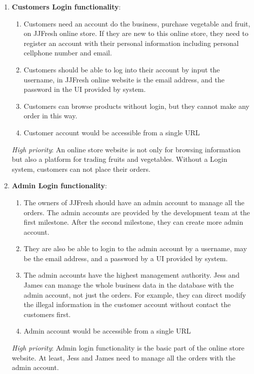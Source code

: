 \documentclass{report}
\begin{document}
\begin{enumerate}
  \item \textbf{Customers Login functionality}:
  \begin{enumerate}
    \item Customers need an account do the business, purchase vegetable and fruit, on JJFresh online store. If they are new to this online store, they need to register an account with their personal information including personal cellphone number and email.
    \item Customers should be able to log into their account by input the username, in JJFresh online website is the email address, and the password in the UI provided by system.
    \item Customers can browse products without login, but they cannot make any order in this way.
    \item Customer account would be accessible from a single URL
  \end{enumerate}

  \textit{High priority}: An online store website is not only for browsing information but also a platform for trading fruits and vegetables. Without a Login system, customers can not place their orders.

  \item \textbf{Admin Login functionality}:
  \begin{enumerate}
    \item The owners of JJFresh should have an admin account to manage all the orders. The admin accounts are provided by the development team at the first milestone. After the second milestone, they can create more admin account.
    \item They are also be able to login to the admin account by a username, may be the email address, and a password by a UI provided by system.
    \item The admin accounts have the highest management authority. Jess and James can manage the whole business data in the database with the admin account, not just the orders. For example, they can direct modify the illegal information in the customer account without contact the customers first.
    \item Admin account would be accessible from a single URL
  \end{enumerate}

  \textit{High priority}: Admin login functionality is the basic part of the online store website. At least, Jess and James need to manage all the orders with the admin account.


\end{enumerate}
\end{document}
